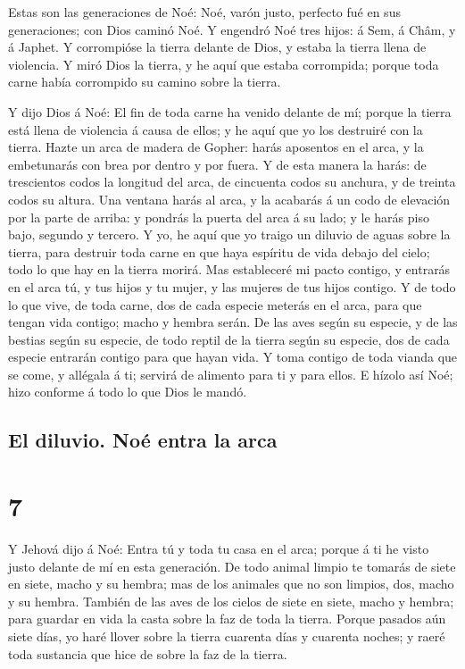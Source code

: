  Estas son las generaciones de Noé: Noé, varón justo,
perfecto fué en sus generaciones; con Dios caminó Noé.  Y
engendró Noé tres hijos: á Sem, á Châm, y á Japhet.  Y
corrompióse la tierra delante de Dios, y estaba la tierra llena de
violencia.  Y miró Dios la tierra, y he aquí que estaba
corrompida; porque toda carne había corrompido su camino sobre la
tierra.

 Y dijo Dios á Noé: El fin de toda carne ha venido
delante de mí; porque la tierra está llena de violencia á causa de
ellos; y he aquí que yo los destruiré con la tierra. 
Hazte un arca de madera de Gopher: harás aposentos en el arca, y la
embetunarás con brea por dentro y por fuera.  Y de esta
manera la harás: de trescientos codos la longitud del arca, de cincuenta
codos su anchura, y de treinta codos su altura.  Una
ventana harás al arca, y la acabarás á un codo de elevación por la parte
de arriba: y pondrás la puerta del arca á su lado; y le harás piso bajo,
segundo y tercero.  Y yo, he aquí que yo traigo un
diluvio de aguas sobre la tierra, para destruir toda carne en que haya
espíritu de vida debajo del cielo; todo lo que hay en la tierra morirá.
 Mas estableceré mi pacto contigo, y entrarás en el arca
tú, y tus hijos y tu mujer, y las mujeres de tus hijos contigo.
 Y de todo lo que vive, de toda carne, dos de cada
especie meterás en el arca, para que tengan vida contigo; macho y hembra
serán.  De las aves según su especie, y de las bestias
según su especie, de todo reptil de la tierra según su especie, dos de
cada especie entrarán contigo para que hayan vida.  Y
toma contigo de toda vianda que se come, y allégala á ti; servirá de
alimento para ti y para ellos.  E hízolo así Noé; hizo
conforme á todo lo que Dios le mandó.

\hypertarget{el-diluvio.-nouxe9-entra-la-arca}{%
\subsection{El diluvio. Noé entra la
arca}\label{el-diluvio.-nouxe9-entra-la-arca}}

\hypertarget{section-6}{%
\section{7}\label{section-6}}

 Y Jehová dijo á Noé: Entra tú y toda tu casa en el arca;
porque á ti he visto justo delante de mí en esta generación.
 De todo animal limpio te tomarás de siete en siete, macho
y su hembra; mas de los animales que no son limpios, dos, macho y su
hembra.  También de las aves de los cielos de siete en
siete, macho y hembra; para guardar en vida la casta sobre la faz de
toda la tierra.  Porque pasados aún siete días, yo haré
llover sobre la tierra cuarenta días y cuarenta noches; y raeré toda
sustancia que hice de sobre la faz de la tierra.

